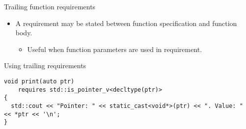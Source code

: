 \begin{frame}[t,fragile]{Trailing function requirements}
\begin{itemize}
  \item A requirement may be stated between function specification and function body.
    \begin{itemize}
      \item Useful when function parameters are used in requirement.
    \end{itemize}
\end{itemize}

\begin{block}{Using trailing requirements}
\begin{lstlisting}
void print(auto ptr)
    requires std::is_pointer_v<decltype(ptr)>
{
  std::cout << "Pointer: " << static_cast<void*>(ptr) << ". Value: " << *ptr << '\n';
}
\end{lstlisting}
\end{block}
\end{frame}
